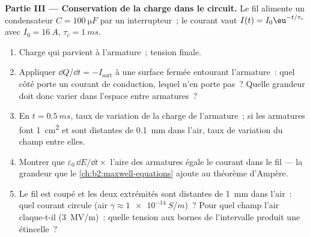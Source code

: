 \begin{problem}
\medskip
\noindent\textbf{Partie III --- Conservation de la charge dans le circuit.}
Le fil alimente un condensateur $C = \qty{100}{\micro F}$ par un interrupteur~; le
courant vaut $I(t) = I_0\eu^{-t/\tau_c}$ avec $I_0 = \qty{16}{A}$, $\tau_c = \qty{1}{ms}$.
\begin{enumerate}[resume]
  \item Charge qui parvient à l'armature~; tension finale.
  \item Appliquer $\dd Q/\dd t = -I_{\text{sort}}$ à une surface fermée entourant
        l'armature~: quel côté porte un courant de conduction, lequel n'en porte pas~?
        Quelle grandeur doit donc varier dans l'espace entre armatures~?
  \item En $t = \qty{0.5}{ms}$, taux de variation de la charge de l'armature~; si les
        armatures font \qty{1}{cm^2} et sont distantes de \qty{0.1}{mm} dans l'air, taux de
        variation du champ entre elles.
  \item Montrer que $\varepsilon_0\,\dd E/\dd t \times$ l'aire des armatures égale le courant
        dans le fil --- la grandeur que le \cref{ch:b2:maxwell-equations}
        ajoute au théorème d'Ampère.
  \item Le fil est coupé et les deux extrémités sont distantes de \qty{1}{mm} dans l'air~:
        quel courant circule (air $\gamma \approx \qty{1e-14}{S/m}$)~? Pour quel
        champ l'air claque-t-il (\qty{3}{MV/m})~: quelle tension aux bornes de
        l'intervalle produit une étincelle~?
\end{enumerate}


\end{problem}
